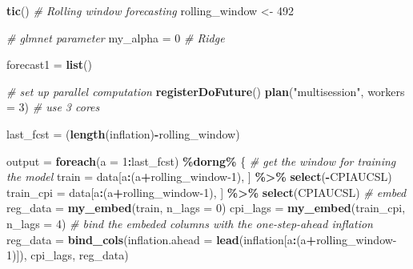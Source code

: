 \documentclass[
]{article}
\newenvironment{Shaded}{\begin{snugshade}}{\end{snugshade}}
\newcommand{\AttributeTok}[1]{\textcolor[rgb]{0.13,0.29,0.53}{#1}}
\newcommand{\CommentTok}[1]{\textcolor[rgb]{0.56,0.35,0.01}{\textit{#1}}}
\newcommand{\DecValTok}[1]{\textcolor[rgb]{0.00,0.00,0.81}{#1}}
\newcommand{\FunctionTok}[1]{\textcolor[rgb]{0.13,0.29,0.53}{\textbf{#1}}}
\newcommand{\NormalTok}[1]{#1}
\newcommand{\OtherTok}[1]{\textcolor[rgb]{0.56,0.35,0.01}{#1}}
\newcommand{\SpecialCharTok}[1]{\textcolor[rgb]{0.81,0.36,0.00}{\textbf{#1}}}
\newcommand{\StringTok}[1]{\textcolor[rgb]{0.31,0.60,0.02}{#1}}
\begin{document}
\begin{Shaded}
\begin{Highlighting}[]
\FunctionTok{tic}\NormalTok{()}
\CommentTok{\# Rolling window forecasting}
\NormalTok{rolling\_window }\OtherTok{\textless{}{-}} \DecValTok{492}

\CommentTok{\# glmnet parameter}
\NormalTok{my\_alpha }\OtherTok{=} \DecValTok{0} \CommentTok{\# Ridge}

\NormalTok{forecast1 }\OtherTok{=} \FunctionTok{list}\NormalTok{()}

\CommentTok{\# set up parallel computation}
\FunctionTok{registerDoFuture}\NormalTok{()}
\FunctionTok{plan}\NormalTok{(}\StringTok{"multisession"}\NormalTok{, }\AttributeTok{workers =} \DecValTok{3}\NormalTok{) }\CommentTok{\# use 3 cores }

\NormalTok{last\_fcst }\OtherTok{=}\NormalTok{ (}\FunctionTok{length}\NormalTok{(inflation)}\SpecialCharTok{{-}}\NormalTok{rolling\_window)}

\NormalTok{output }\OtherTok{=} \FunctionTok{foreach}\NormalTok{(}\AttributeTok{a =} \DecValTok{1}\SpecialCharTok{:}\NormalTok{last\_fcst) }\SpecialCharTok{\%dorng\%}\NormalTok{ \{ }
  \CommentTok{\# get the window for training the model}
\NormalTok{  train }\OtherTok{=}\NormalTok{ data[a}\SpecialCharTok{:}\NormalTok{(a}\SpecialCharTok{+}\NormalTok{rolling\_window}\DecValTok{{-}1}\NormalTok{), ] }\SpecialCharTok{\%\textgreater{}\%} \FunctionTok{select}\NormalTok{(}\SpecialCharTok{{-}}\NormalTok{CPIAUCSL)}
\NormalTok{  train\_cpi }\OtherTok{=}\NormalTok{ data[a}\SpecialCharTok{:}\NormalTok{(a}\SpecialCharTok{+}\NormalTok{rolling\_window}\DecValTok{{-}1}\NormalTok{), ] }\SpecialCharTok{\%\textgreater{}\%} \FunctionTok{select}\NormalTok{(CPIAUCSL)}
  \CommentTok{\# embed}
\NormalTok{  reg\_data }\OtherTok{=} \FunctionTok{my\_embed}\NormalTok{(train, }\AttributeTok{n\_lags =} \DecValTok{0}\NormalTok{) }
\NormalTok{  cpi\_lags }\OtherTok{=} \FunctionTok{my\_embed}\NormalTok{(train\_cpi, }\AttributeTok{n\_lags =} \DecValTok{4}\NormalTok{)}
  \CommentTok{\# bind the embeded columns with the one{-}step{-}ahead inflation}
\NormalTok{  reg\_data }\OtherTok{=} \FunctionTok{bind\_cols}\NormalTok{(}\AttributeTok{inflation.ahead =} \FunctionTok{lead}\NormalTok{(inflation[a}\SpecialCharTok{:}\NormalTok{(a}\SpecialCharTok{+}\NormalTok{rolling\_window}\DecValTok{{-}1}\NormalTok{)]), }
\NormalTok{                       cpi\_lags, reg\_data)}
  

\end{Highlighting}
\end{Shaded}
\end{document}
